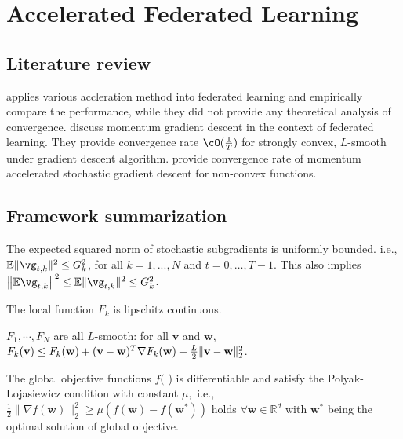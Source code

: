 

\section{Accelerated Federated Learning}

\subsection{Literature review}

\cite{felbab2019optimization} applies various accleration method
into federated learning and empirically compare the performance, 
while they did not provide any theoretical analysis of convergence.
\cite{liu2019accelerating} discuss momentum gradient descent
in the context of federated learning. They provide
convergence rate $\cO(\frac{1}{T})$ 
for strongly convex, $L$-smooth under gradient
descent algorithm. 
\cite{huo2020faster} provide convergence rate of momentum accelerated 
stochastic gradient descent for non-convex functions. 


\subsection{Framework summarization}

\begin{assumption}
The expected squared norm of stochastic subgradients is uniformly bounded. i.e.,
$\mathbb{E}\|\vg_{t,k}\|^2  \leq G_k^{2}$, for all $k = 1,..., N$ and $t=0, \dots, T-1$.  This also implies $\left\| \mathbb{E}\vg_{t,k}\right\|^2  \leq \mathbb{E}\|\vg_{t,k}\|^2 \leq G_k^2$.
\label{ass:subgrad2}
\end{assumption}

\begin{assumption}
	The local function $F_k$ is lipschitz continuous. 
	\label{ass:lipcont}
\end{assumption}

\begin{assumption}[L-smooth]
$F_{1}, \cdots, F_{N}$ are all $L$-smooth: for all  $\mathbf{v}$  and $\mathbf{w}$, $F_{k}(\mathbf{v}) \leq F_{k}(\mathbf{w})+(\mathbf{v}- \\ \mathbf{w})^{T} \nabla F_{k}(\mathbf{w})+\frac{L}{2}\|\mathbf{v}-\mathbf{w}\|_{2}^{2}$.
\label{ass:lsmooth}
\end{assumption}

\begin{assumption} The global objective functions $f($ ) is differentiable and satisfy the Polyak-Lojasiewicz condition with constant $\mu,$ i.e., $\frac{1}{2}\|\nabla f(\boldsymbol{w})\|_{2}^{2} \geq \mu\left(f(\boldsymbol{w})-f\left(\boldsymbol{w}^{*}\right)\right)$ holds $\forall \boldsymbol{w} \in \mathbb{R}^{d}$ with
$\boldsymbol{w}^{*}$ being the optimal solution of global objective.
\label{ass:pl}
\end{assumption}

